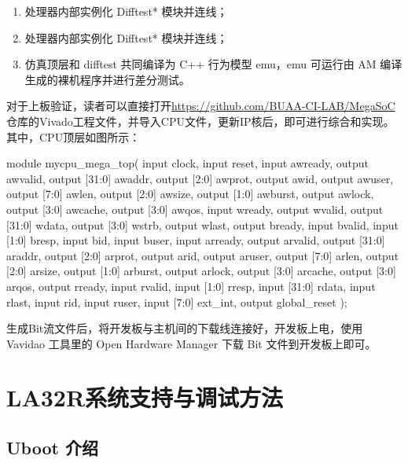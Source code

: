 \begin{enumerate}
\def\labelenumi{\arabic{enumi}.}
\item
  处理器内部实例化 Difftest* 模块并连线；
\item
  处理器内部实例化 Difftest* 模块并连线；
\item
  仿真顶层和 difftest 共同编译为 C++ 行为模型 emu，emu 可运行由 AM 编译生成的裸机程序并进行差分测试。
\end{enumerate}

对于上板验证，读者可以直接打开\url{https://github.com/BUAA-CI-LAB/MegaSoC}仓库的Vivado工程文件，并导入CPU文件，更新IP核后，即可进行综合和实现。其中，CPU顶层如图所示：

\begin{CodeBlock}[language=BookVerilog]
module mycpu_mega_top(
  input         clock,
  input         reset,
  input         awready,
  output        awvalid,
  output [31:0] awaddr,
  output [2:0]  awprot,
  output        awid,
  output        awuser,
  output [7:0]  awlen,
  output [2:0]  awsize,
  output [1:0]  awburst,
  output        awlock,
  output [3:0]  awcache,
  output [3:0]  awqos,
  input         wready,
  output        wvalid,
  output [31:0] wdata,
  output [3:0]  wstrb,
  output        wlast,
  output        bready,
  input         bvalid,
  input  [1:0]  bresp,
  input         bid,
  input         buser,
  input         arready,
  output        arvalid,
  output [31:0] araddr,
  output [2:0]  arprot,
  output        arid,
  output        aruser,
  output [7:0]  arlen,
  output [2:0]  arsize,
  output [1:0]  arburst,
  output        arlock,
  output [3:0]  arcache,
  output [3:0]  arqos,
  output        rready,
  input         rvalid,
  input  [1:0]  rresp,
  input  [31:0] rdata,
  input         rlast,
  input         rid,
  input         ruser,
  input  [7:0]  ext_int,
  output        global_reset
);
\end{CodeBlock}

生成Bit流文件后，将开发板与主机间的下载线连接好，开发板上电，使用 Vavidao 工具里的 Open Hardware Manager 下载 Bit 文件到开发板上即可。

\section{LA32R系统支持与调试方法}\label{sec:04-toolchain-015}

\subsection{Uboot 介绍}\label{sec:04-toolchain-016}

